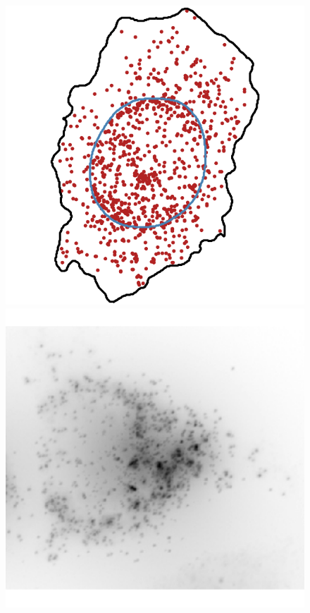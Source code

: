 \begin{figure}[]
		\includegraphics[width=0.95\linewidth]{figures/introduction/real_coord_nuclear_edge}
	\endminipage\hfill
		\includegraphics[width=0.95\linewidth]{figures/introduction/real_image_perinuclear}
		\vfill

\end{figure}
